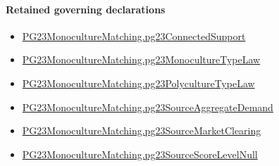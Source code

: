 \documentclass[10pt]{article}
\begin{document}
\paragraph{Retained governing declarations}
\begin{itemize}\raggedright
\item \hyperlink{paper-prerequisite-3ea91dd17eec5e64}{PG23\allowbreak{}Monoculture\allowbreak{}Matching.\allowbreak{}pg23\allowbreak{}Connected\allowbreak{}Support}
\item \hyperlink{paper-prerequisite-e248b62a880a6917}{PG23\allowbreak{}Monoculture\allowbreak{}Matching.\allowbreak{}pg23\allowbreak{}Monoculture\allowbreak{}Type\allowbreak{}Law}
\item \hyperlink{paper-prerequisite-57a6e28ae64a74da}{PG23\allowbreak{}Monoculture\allowbreak{}Matching.\allowbreak{}pg23\allowbreak{}Polyculture\allowbreak{}Type\allowbreak{}Law}
\item \hyperlink{paper-prerequisite-3fb2e1ac28891e7d}{PG23\allowbreak{}Monoculture\allowbreak{}Matching.\allowbreak{}pg23\allowbreak{}Source\allowbreak{}Aggregate\allowbreak{}Demand}
\item \hyperlink{paper-prerequisite-55bbf5d44984bdf1}{PG23\allowbreak{}Monoculture\allowbreak{}Matching.\allowbreak{}pg23\allowbreak{}Source\allowbreak{}Market\allowbreak{}Clearing}
\item \hyperlink{paper-prerequisite-26aa95cb7c69a47b}{PG23\allowbreak{}Monoculture\allowbreak{}Matching.\allowbreak{}pg23\allowbreak{}Source\allowbreak{}Score\allowbreak{}Level\allowbreak{}Null}
\end{itemize}
\end{document}
